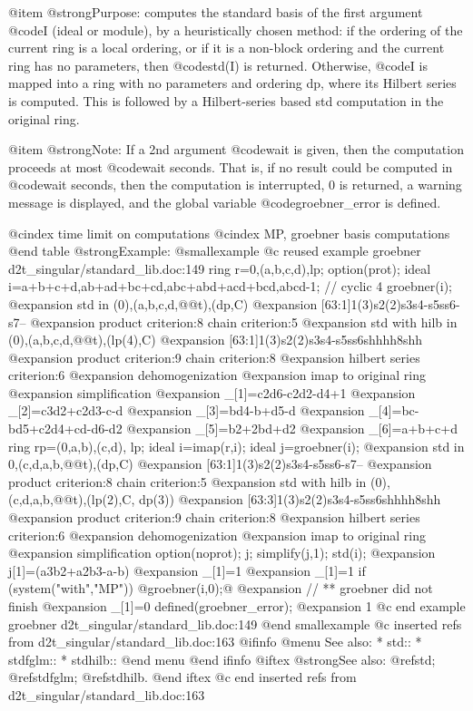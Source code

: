 {@item @strong{Purpose:}
computes the standard basis of the first argument @code{I}
(ideal or module), by a heuristically chosen method: if the
ordering of the current ring is a local ordering, or if it is a
non-block ordering and the current ring has no parameters, then
@code{std(I)} is returned. Otherwise, @code{I} is mapped into a
ring with no parameters and ordering dp, where its Hilbert series
is computed. This is followed by a Hilbert-series based std
computation in the original ring.

@item @strong{Note:}
If a 2nd argument @code{wait} is given, then the computation proceeds
at most @code{wait} seconds. That is, if no result could be computed in
@code{wait} seconds, then the computation is interrupted, 0 is returned,
a warning message is displayed, and the global variable
@code{groebner_error} is defined.

@cindex time limit on computations
@cindex MP, groebner basis computations
@end table
@strong{Example:}
@smallexample
@c reused example groebner d2t_singular/standard_lib.doc:149 
  ring r=0,(a,b,c,d),lp;
option(prot);
ideal i=a+b+c+d,ab+ad+bc+cd,abc+abd+acd+bcd,abcd-1; // cyclic 4
groebner(i);
@expansion{} std in (0),(a,b,c,d,@@t),(dp,C)
@expansion{} [63:1]1(3)s2(2)s3s4-s5ss6-s7--
@expansion{} product criterion:8 chain criterion:5
@expansion{} std with hilb in  (0),(a,b,c,d,@@t),(lp(4),C)
@expansion{} [63:1]1(3)s2(2)s3s4-s5ss6shhhh8shh
@expansion{} product criterion:9 chain criterion:8
@expansion{} hilbert series criterion:6
@expansion{} dehomogenization
@expansion{} imap to original ring
@expansion{} simplification
@expansion{} _[1]=c2d6-c2d2-d4+1
@expansion{} _[2]=c3d2+c2d3-c-d
@expansion{} _[3]=bd4-b+d5-d
@expansion{} _[4]=bc-bd5+c2d4+cd-d6-d2
@expansion{} _[5]=b2+2bd+d2
@expansion{} _[6]=a+b+c+d
ring rp=(0,a,b),(c,d), lp;
ideal i=imap(r,i);
ideal j=groebner(i);
@expansion{} std in 0,(c,d,a,b,@@t),(dp,C)
@expansion{} [63:1]1(3)s2(2)s3s4-s5ss6-s7--
@expansion{} product criterion:8 chain criterion:5
@expansion{} std with hilb in  (0),(c,d,a,b,@@t),(lp(2),C, dp(3))
@expansion{} [63:3]1(3)s2(2)s3s4-s5ss6shhhh8shh
@expansion{} product criterion:9 chain criterion:8
@expansion{} hilbert series criterion:6
@expansion{} dehomogenization
@expansion{} imap to original ring
@expansion{} simplification
option(noprot);
j; simplify(j,1); std(i);
@expansion{} j[1]=(a3b2+a2b3-a-b)
@expansion{} _[1]=1
@expansion{} _[1]=1
if (system("with","MP")) @{groebner(i,0);@}
@expansion{} // ** groebner did not finish
@expansion{} _[1]=0
defined(groebner_error);
@expansion{} 1
@c end example groebner d2t_singular/standard_lib.doc:149
@end smallexample
@c inserted refs from d2t_singular/standard_lib.doc:163
@ifinfo
@menu
See also:
* std::
* stdfglm::
* stdhilb::
@end menu
@end ifinfo
@iftex
@strong{See also:}
@ref{std};
@ref{stdfglm};
@ref{stdhilb}.
@end iftex
@c end inserted refs from d2t_singular/standard_lib.doc:163

}
